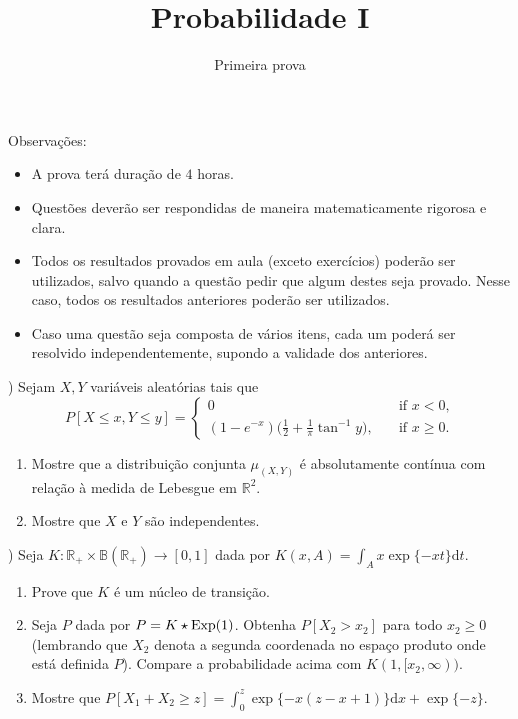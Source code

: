 \documentclass{article}
\def\d{\mathrm{d}}
\begin{document}
\title{Probabilidade I}
\author{Primeira prova}

\maketitle

\noindent Observa\c{c}\~oes:
\begin{itemize}
\item A prova ter\'a dura\c{c}\~ao de $ 4 $ horas.
\item Quest\~oes dever\~ao ser respondidas de maneira ma\-te\-ma\-ti\-ca\-men\-te rigorosa e clara.
\item Todos os resultados provados em aula (exceto exerc\'icios) poder\~ao ser utilizados, salvo quando a quest\~ao pedir que algum destes seja provado. Nesse caso, todos os resultados anteriores poder\~ao ser utilizados.
\item Caso uma quest\~ao seja composta de v\'arios itens, cada um poder\'a ser resolvido independentemente, supondo a validade dos anteriores.
\end{itemize}

\vspace{4mm}
) Sejam $X, Y$ vari\'aveis aleat\'orias tais que
\begin{equation}
  P[X \leq x, Y \leq y] =
  \begin{cases}
    0 & \quad \text{if $x < 0$,}\\
    (1-e^{-x}) \Big(\frac 12 + \frac 1\pi \tan^{-1} y \Big), & \quad \text{if $x \geq 0$}.
  \end{cases}
\end{equation}
\begin{enumerate}[\quad a)]
  \item Mostre que a distribui\c{c}\~ao conjunta $\mu_{(X,Y)}$ \'e
  absolutamente cont\'inua com rela\c{c}\~ao \`a medida de Lebesgue em
  $\mathbb{R}^2$.
  \item Mostre que $X$ e $Y$ s\~ao independentes.
\end{enumerate}
\medskip

) Seja $K:\mathbb{R}_+ \times \mathbb{B}(\mathbb{R}_+) \to [0,1]$ dada por $K(x,A) = \int_A x \exp\{-x t\} \d t$.
\begin{enumerate}[\quad a)]
  \item Prove que $K$ \'e um n\'ucleo de transi\c{c}\~ao.
  \item Seja $P$ dada por $P = K \star \textnormal{Exp}(1)$. Obtenha $P[X_2 > x_2]$ para todo $x_2 \geq 0$ (lembrando que $X_2$ denota a segunda coordenada no espa\c{c}o produto onde est\'a definida $P$). Compare a probabilidade acima com $K(1,[x_2, \infty))$.
  \item Mostre que $P[X_1 + X_2 \geq z] = \int_0^z \exp \{-x(z-x+1)\} \d x + \exp\{-z\}$.
\end{enumerate}
\end{document}

